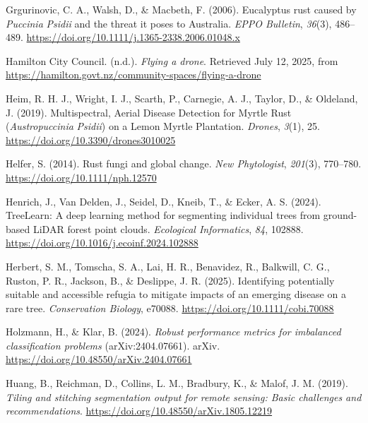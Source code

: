 \documentclass[
]{scrreprt}
\newlength{\cslhangindent}
\newenvironment{CSLReferences}[2] %
 {\begin{list}{}{%
  \setlength{\itemindent}{0pt}
  \setlength{\leftmargin}{0pt}
  \setlength{\parsep}{0pt}
  \setlength{\baselineskip}{12pt}
  \ifodd #1
   \setlength{\leftmargin}{\cslhangindent}
   \setlength{\itemindent}{-1\cslhangindent}
  \fi
  \setlength{\itemsep}{4pt}}}
 {\end{list}}
\begin{document}
\begin{CSLReferences}{1}{0}
Grgurinovic, C. A., Walsh, D., \& Macbeth, F. (2006). Eucalyptus rust
caused by {\emph{Puccinia}}{ \emph{Psidii}} and the threat it poses to
{Australia}. \emph{EPPO Bulletin}, \emph{36}(3), 486--489.
\url{https://doi.org/10.1111/j.1365-2338.2006.01048.x}

Hamilton City Council. (n.d.). \emph{Flying a drone}. Retrieved July 12,
2025, from
\url{https://hamilton.govt.nz/community-spaces/flying-a-drone}

Heim, R. H. J., Wright, I. J., Scarth, P., Carnegie, A. J., Taylor, D.,
\& Oldeland, J. (2019). Multispectral, {Aerial Disease Detection} for
{Myrtle Rust} ({\emph{Austropuccinia}}{ \emph{Psidii}}) on a {Lemon
Myrtle Plantation}. \emph{Drones}, \emph{3}(1), 25.
\url{https://doi.org/10.3390/drones3010025}

Helfer, S. (2014). Rust fungi and global change. \emph{New Phytologist},
\emph{201}(3), 770--780. \url{https://doi.org/10.1111/nph.12570}

Henrich, J., Van Delden, J., Seidel, D., Kneib, T., \& Ecker, A. S.
(2024). {TreeLearn}: {A} deep learning method for segmenting individual
trees from ground-based {LiDAR} forest point clouds. \emph{Ecological
Informatics}, \emph{84}, 102888.
\url{https://doi.org/10.1016/j.ecoinf.2024.102888}

Herbert, S. M., Tomscha, S. A., Lai, H. R., Benavidez, R., Balkwill, C.
G., Ruston, P. R., Jackson, B., \& Deslippe, J. R. (2025). Identifying
potentially suitable and accessible refugia to mitigate impacts of an
emerging disease on a rare tree. \emph{Conservation Biology}, e70088.
\url{https://doi.org/10.1111/cobi.70088}

Holzmann, H., \& Klar, B. (2024). \emph{Robust performance metrics for
imbalanced classification problems} (arXiv:2404.07661). arXiv.
\url{https://doi.org/10.48550/arXiv.2404.07661}

Huang, B., Reichman, D., Collins, L. M., Bradbury, K., \& Malof, J. M.
(2019). \emph{Tiling and stitching segmentation output for remote
sensing: Basic challenges and recommendations}.
\url{https://doi.org/10.48550/arXiv.1805.12219}


\end{CSLReferences}
\end{document}
